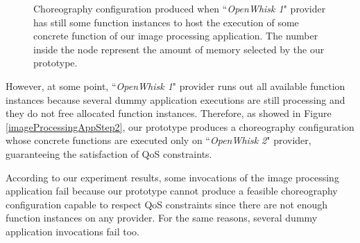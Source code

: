 \documentclass[12pt,a4paper]{report}
\newcommand{\ItalicQuotMark}[1]{``\textit{#1}"}
\begin{document}
\begin{figure}[!ht]
	\caption{Choreography configuration produced when \ItalicQuotMark{OpenWhisk 1} provider has still some function instances to host the execution of some concrete function of our image processing application. The number inside the node represent the amount of memory selected by the our prototype.}
	\label{imageProcessingAppStep1}
\end{figure}

However, at some point, \ItalicQuotMark{OpenWhisk 1} provider runs out all available function instances because several dummy application executions are still processing and they do not free allocated function instances. Therefore, as showed in Figure \ref{imageProcessingAppStep2}, our prototype produces a choreography configuration whose concrete functions are executed only on \ItalicQuotMark{OpenWhisk 2} provider, guaranteeing the satisfaction of QoS constraints.

According to our experiment results, some invocations of the image processing application fail because our prototype cannot produce a feasible choreography configuration capable to respect QoS constraints since there are not enough function instances on any provider. For the same reasons, several dummy application invocations fail too.
\end{document}
